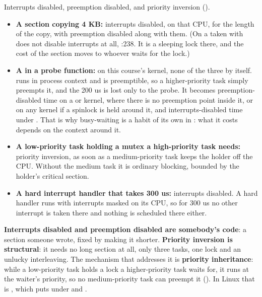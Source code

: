  Interrupts disabled, preemption disabled, and priority inversion ().

\begin{itemize}
  \item \textbf{A  section copying 4 KB:} interrupts disabled, on that CPU,
    for the length of the copy, with preemption disabled along with them. (On  a
     taken with  does not disable interrupts at all,
    :238. It is a sleeping lock there, and the cost of
    the section moves to whoever waits for the lock.)
  \item \textbf{A  in a probe function:} on this course's  kernel,
    none of the three by itself.  runs in process context and is preemptible, so a
    higher-priority task simply preempts it, and the 200 us is lost only to the probe. It becomes
    preemption-disabled time on a  or  kernel, where
    there is no preemption point inside it, or on any kernel if a spinlock is held around it, and
    interrupts-disabled time under . That is why busy-waiting is a habit of
    its own in : what it costs depends on the context around it.
  \item \textbf{A low-priority task holding a mutex a high-priority task needs:} priority inversion,
    as soon as a medium-priority task keeps the holder off the CPU. Without the medium task it is
    ordinary blocking, bounded by the holder's critical section.
  \item \textbf{A hard interrupt handler that takes 300 us:} interrupts disabled. A hard handler runs
    with interrupts masked on its CPU, so for 300 us no other interrupt is taken there and nothing
    is scheduled there either.
\end{itemize}

 \textbf{Interrupts disabled and preemption disabled are somebody's code}: a section someone
wrote, fixed by making it shorter. \textbf{Priority inversion is structural}: it needs no long
section at all, only three tasks, one lock and an unlucky interleaving. The mechanism that addresses
it is \textbf{priority inheritance}: while a low-priority task holds a lock a higher-priority task
waits for, it runs at the waiter's priority, so no medium-priority task can preempt it
(). In Linux that is , which  puts under
 and .

